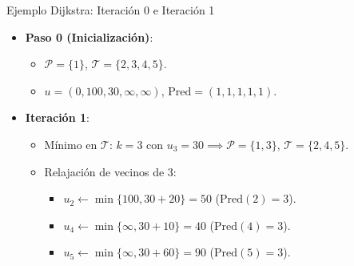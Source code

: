 \documentclass[
  ignorenonframetext,
]{beamer}
\providecommand{\tightlist}{%
  \setlength{\itemsep}{0pt}\setlength{\parskip}{0pt}}
\begin{document}
\begin{frame}{Ejemplo Dijkstra: Iteración 0 e Iteración 1}
\label{ejemplo-dijkstra-iteraciuxf3n-0-e-iteraciuxf3n-1}
\begin{itemize}
\tightlist
\item
  \textbf{Paso 0 (Inicialización)}:

  \begin{itemize}
  \tightlist
  \item
    \(\mathcal{P} = \{1\}\), \(\mathcal{T} = \{2, 3, 4, 5\}\).
  \item
    \(u = (0, 100, 30, \infty, \infty)\),
    \(\text{Pred} = (1, 1, 1, 1, 1)\).
  \end{itemize}
\item
  \textbf{Iteración 1}:

  \begin{itemize}
  \tightlist
  \item
    Mínimo en \(\mathcal{T}\): \(k = 3\) con
    \(u_3 = 30 \implies \mathcal{P} = \{1, 3\}\),
    \(\mathcal{T} = \{2, 4, 5\}\).
  \item
    Relajación de vecinos de 3:

    \begin{itemize}
    \tightlist
    \item
      \(u_2 \leftarrow \min \{100, 30 + 20\} = 50\)
      (\(\text{Pred}(2) = 3\)).
    \item
      \(u_4 \leftarrow \min \{\infty, 30 + 10\} = 40\)
      (\(\text{Pred}(4) = 3\)).
    \item
      \(u_5 \leftarrow \min \{\infty, 30 + 60\} = 90\)
      (\(\text{Pred}(5) = 3\)).
    \end{itemize}
  \end{itemize}
\end{itemize}
\end{frame}
\end{document}
